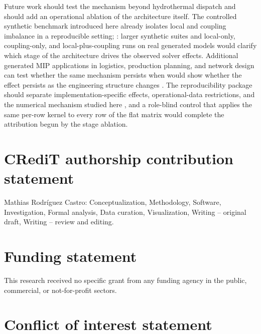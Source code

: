 \documentclass[AMA,Times1COL]{WileyNJDv5} %
\providecommand{\DIFadd}[1]{{\protect\color{blue} \sf #1}} %
\providecommand{\DIFdel}[1]{{\protect\color{red} \scriptsize #1}} %
\providecommand{\DIFaddbegin}{} %
\providecommand{\DIFaddend}{} %
\providecommand{\DIFdelbegin}{} %
\providecommand{\DIFdelend}{} %
\begin{document}
Future work should test the mechanism beyond hydrothermal dispatch\DIFdelbegin \DIFdel{and should add an operational ablation of the architecture itself. The controlled synthetic benchmark introduced here already isolates local and coupling imbalance in a reproducible setting; }\DIFdelend \DIFaddbegin \DIFadd{: }\DIFaddend larger synthetic suites
and \DIFdelbegin \DIFdel{local-only, coupling-only, and local-plus-coupling runs on real generated models would clarify which stage of the architecture drives the observed solver effects. Additional generated MIP }\DIFdelend applications in logistics, production planning, and network design \DIFdelbegin \DIFdel{can test whether the
same mechanism persists when }\DIFdelend \DIFaddbegin \DIFadd{would show whether the
effect persists as }\DIFaddend the engineering structure changes\DIFdelbegin \DIFdel{. The reproducibility package should separate implementation-specific effects, operational-data restrictions, and the numerical mechanism studied here}\DIFdelend \DIFaddbegin \DIFadd{, and a role-blind control that applies
the same per-row kernel to every row of the flat matrix would complete the attribution begun
by the stage ablation}\DIFaddend .


\DIFdelbegin \section*{\DIFdel{CRediT authorship contribution statement}}
\DIFdelend \DIFaddbegin {}
\DIFaddend 

Mathias Rodr\'iguez Castro: Conceptualization, Methodology, Software,
Investigation, Formal analysis, Data curation, Visualization, Writing -- original draft,
Writing -- review and editing.

\DIFdelbegin \section*{\DIFdel{Funding statement}}
\DIFdelend \DIFaddbegin {}
\DIFaddend 

This research received no specific grant from any funding agency in the public,
commercial, or not-for-profit sectors.

\DIFdelbegin \section*{\DIFdel{Conflict of interest statement}}
\DIFdelend \DIFaddbegin {}
\DIFaddend 
\end{document}
